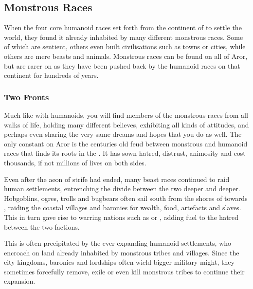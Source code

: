 \subsection{Monstrous Races}
\label{sec:Monstrous Races}


When the four core humanoid races set forth from the continent of
 to settle the world, they found it already inhabited
by many different monstrous races. Some of which are sentient, others even
built civilisations such as towns or cities, while others are mere beasts
and animals. Monstrous races can be found on all of Aror, but are rarer on
 as they have been pushed back by the humanoid races
on that continent for hundreds of years.

\subsubsection{Two Fronts}

Much like with humanoids, you will find members of the monstrous races from
all walks of life, holding many different believes, exhibiting all kinds of
attitudes, and perhaps even sharing the very same dreams and hopes that you do
as well. The only constant on Aror is the centuries old feud between monstrous
and humanoid races that finds its roots in the . It has sown hatred, distrust, animosity and cost thousands, if not
millions of lives on both sides.

Even after the aeon of strife had ended, many beast races continued to raid
human settlements, entrenching the divide between the two deeper and deeper.
Hobgoblins, ogres, trolls and bugbears often sail south from the shores of
 towards , raiding the coastal
villages and baronies for wealth, food, artefacts and slaves. This in turn
gave rise to warring nations such as  or
, adding fuel to the hatred between the two factions.

This is often precipitated by the ever expanding humanoid settlements, who
encroach on land already inhabited by monstrous tribes and villages. Since the
city kingdoms, baronies and lordships often wield bigger military might, they
sometimes forcefully remove, exile or even kill monstrous tribes to continue
their expansion.

